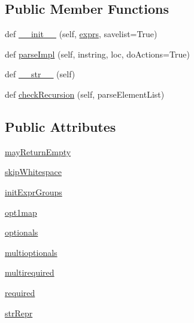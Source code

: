 \subsection*{Public Member Functions}
\begin{DoxyCompactItemize}
\item 
def \hyperlink{classpkg__resources_1_1__vendor_1_1pyparsing_1_1Each_a646bcb9698b865ddc39c2154584d04ef}{\+\_\+\+\_\+init\+\_\+\+\_\+} (self, \hyperlink{classpkg__resources_1_1__vendor_1_1pyparsing_1_1ParseExpression_ae9e07a06d183190717e964e7ff907363}{exprs}, savelist=True)
\item 
def \hyperlink{classpkg__resources_1_1__vendor_1_1pyparsing_1_1Each_a0277c6df01ea0101941a2ee9acaf3175}{parse\+Impl} (self, instring, loc, do\+Actions=True)
\item 
def \hyperlink{classpkg__resources_1_1__vendor_1_1pyparsing_1_1Each_af494063906a9245aedc8a5f8fa5a434d}{\+\_\+\+\_\+str\+\_\+\+\_\+} (self)
\item 
def \hyperlink{classpkg__resources_1_1__vendor_1_1pyparsing_1_1Each_a81a5097b601ac0ab5fe3a8b39532625e}{check\+Recursion} (self, parse\+Element\+List)
\end{DoxyCompactItemize}
\subsection*{Public Attributes}
\begin{DoxyCompactItemize}
\item 
\hyperlink{classpkg__resources_1_1__vendor_1_1pyparsing_1_1Each_a783e901389f7cae5ffc59f483c3b9198}{may\+Return\+Empty}
\item 
\hyperlink{classpkg__resources_1_1__vendor_1_1pyparsing_1_1Each_ac682c59d653949b172cd24ff54ff600a}{skip\+Whitespace}
\item 
\hyperlink{classpkg__resources_1_1__vendor_1_1pyparsing_1_1Each_aa1c81ad386cda29aba979923d8ad9c35}{init\+Expr\+Groups}
\item 
\hyperlink{classpkg__resources_1_1__vendor_1_1pyparsing_1_1Each_a03b4cb16f0ba67bada1b36cc359eec39}{opt1map}
\item 
\hyperlink{classpkg__resources_1_1__vendor_1_1pyparsing_1_1Each_a49dfbf357423fa0ed55c414f8c47576f}{optionals}
\item 
\hyperlink{classpkg__resources_1_1__vendor_1_1pyparsing_1_1Each_ae49b71a052474042947202a0eec8a924}{multioptionals}
\item 
\hyperlink{classpkg__resources_1_1__vendor_1_1pyparsing_1_1Each_a9df12f5ef37bcabcbd91d87a1f9990f4}{multirequired}
\item 
\hyperlink{classpkg__resources_1_1__vendor_1_1pyparsing_1_1Each_a426a75d9821515687533875322c3fff4}{required}
\item 
\hyperlink{classpkg__resources_1_1__vendor_1_1pyparsing_1_1Each_aa7088b645ce66dfccce0bd3178a28fd0}{str\+Repr}
\end{DoxyCompactItemize}
